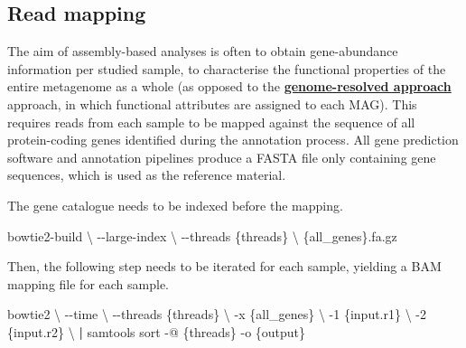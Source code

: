 \documentclass[
]{book}
\newenvironment{Shaded}{\begin{snugshade}}{\end{snugshade}}
\newcommand{\AttributeTok}[1]{\textcolor[rgb]{0.13,0.29,0.53}{#1}}
\newcommand{\DataTypeTok}[1]{\textcolor[rgb]{0.13,0.29,0.53}{#1}}
\newcommand{\ExtensionTok}[1]{#1}
\newcommand{\KeywordTok}[1]{\textcolor[rgb]{0.13,0.29,0.53}{\textbf{#1}}}
\newcommand{\NormalTok}[1]{#1}
\begin{document}
\hypertarget{assembly-read-mapping}{%
\subsection*{Read mapping}\label{assembly-read-mapping}}

The aim of assembly-based analyses is often to obtain gene-abundance information per studied sample, to characterise the functional properties of the entire metagenome as a whole (as opposed to the \textbf{\protect\hyperlink{genome-resolved}{genome-resolved approach}} approach, in which functional attributes are assigned to each MAG). This requires reads from each sample to be mapped against the sequence of all protein-coding genes identified during the annotation process. All gene prediction software and annotation pipelines produce a FASTA file only containing gene sequences, which is used as the reference material.

The gene catalogue needs to be indexed before the mapping.

\small

\begin{Shaded}
\begin{Highlighting}[]
\ExtensionTok{bowtie2{-}build} \DataTypeTok{\textbackslash{}}
      \AttributeTok{{-}{-}large{-}index} \DataTypeTok{\textbackslash{}}
      \AttributeTok{{-}{-}threads}\NormalTok{ \{threads\} }\DataTypeTok{\textbackslash{}}
\NormalTok{       \{all\_genes\}.fa.gz}
\end{Highlighting}
\end{Shaded}

\normalsize

Then, the following step needs to be iterated for each sample, yielding a BAM mapping file for each sample.

\small

\begin{Shaded}
\begin{Highlighting}[]
\ExtensionTok{bowtie2} \DataTypeTok{\textbackslash{}}
      \AttributeTok{{-}{-}time} \DataTypeTok{\textbackslash{}}
      \AttributeTok{{-}{-}threads}\NormalTok{ \{threads\} }\DataTypeTok{\textbackslash{}}
      \AttributeTok{{-}x}\NormalTok{ \{all\_genes\} }\DataTypeTok{\textbackslash{}}
      \AttributeTok{{-}1}\NormalTok{ \{input.r1\} }\DataTypeTok{\textbackslash{}}
      \AttributeTok{{-}2}\NormalTok{ \{input.r2\} }\DataTypeTok{\textbackslash{}}
      \KeywordTok{|} \ExtensionTok{samtools}\NormalTok{ sort }\AttributeTok{{-}@}\NormalTok{ \{threads\} }\AttributeTok{{-}o}\NormalTok{ \{output\}}
\end{Highlighting}
\end{Shaded}
\end{document}

